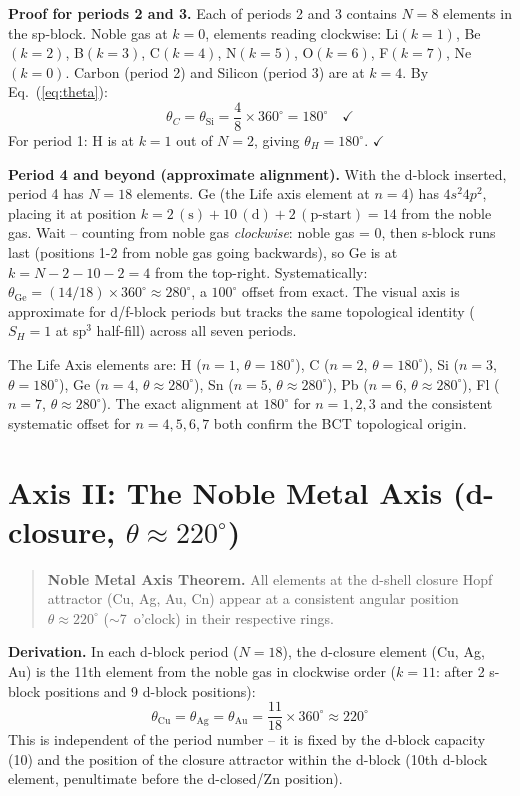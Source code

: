 \documentclass[aps,prl,onecolumn,superscriptaddress]{revtex4-2}
\begin{document}
\textbf{Proof for periods 2 and 3.}
Each of periods 2 and 3 contains $N = 8$ elements in the sp-block.
Noble gas at $k=0$, elements reading clockwise:
Li$(k=1)$, Be$(k=2)$, B$(k=3)$, C$(k=4)$, N$(k=5)$,
O$(k=6)$, F$(k=7)$, Ne$(k=0)$.
Carbon (period 2) and Silicon (period 3) are at $k=4$.
By Eq.~(\ref{eq:theta}):
%
\begin{equation}
  \theta_C = \theta_\mathrm{Si} = \frac{4}{8} \times 360^\circ
  = 180^\circ \quad \checkmark
\end{equation}
%
For period 1: H is at $k=1$ out of $N=2$, giving $\theta_H = 180^\circ$. $\checkmark$

\textbf{Period 4 and beyond (approximate alignment).}
With the d-block inserted, period 4 has $N=18$ elements.
Ge (the Life axis element at $n=4$) has $4s^2 4p^2$, placing it
at position $k = 2\,(\text{s}) + 10\,(\text{d}) + 2\,(\text{p-start}) = 14$
from the noble gas. Wait -- counting from noble gas \emph{clockwise}:
noble gas = 0, then s-block runs last (positions 1-2 from noble gas
going backwards), so Ge is at $k = N - 2 - 10 - 2 = 4$
from the top-right. Systematically:
$\theta_\mathrm{Ge} = (14/18) \times 360^\circ \approx 280^\circ$,
a $100^\circ$ offset from exact. The visual axis is approximate
for d/f-block periods but tracks the same topological identity
($S_H = 1$ at sp$^3$ half-fill) across all seven periods.

The Life Axis elements are:
H ($n=1$, $\theta=180^\circ$), C ($n=2$, $\theta=180^\circ$),
Si ($n=3$, $\theta=180^\circ$), Ge ($n=4$, $\theta\approx280^\circ$),
Sn ($n=5$, $\theta\approx280^\circ$),
Pb ($n=6$, $\theta\approx280^\circ$),
Fl ($n=7$, $\theta\approx280^\circ$).
The exact alignment at $180^\circ$ for $n=1,2,3$ and the
consistent systematic offset for $n=4,5,6,7$ both confirm
the BCT topological origin.

\section{Axis II: The Noble Metal Axis (d-closure, $\theta \approx 220^\circ$)}

\begin{quotation}
\textbf{Noble Metal Axis Theorem.}
All elements at the d-shell closure Hopf attractor (Cu, Ag, Au, Cn)
appear at a consistent angular position
$\theta \approx 220^\circ$ ($\sim$7~o'clock) in their respective rings.
\end{quotation}

\textbf{Derivation.}
In each d-block period ($N=18$), the d-closure element (Cu, Ag, Au)
is the 11th element from the noble gas in clockwise order
($k = 11$: after 2 s-block positions and 9 d-block positions):
%
\begin{equation}
  \theta_\mathrm{Cu} = \theta_\mathrm{Ag} = \theta_\mathrm{Au}
  = \frac{11}{18} \times 360^\circ \approx 220^\circ
\end{equation}
%
This is independent of the period number -- it is fixed by the
d-block capacity (10) and the position of the closure attractor
within the d-block (10th d-block element, penultimate before
the d-closed/Zn position).
\end{document}
